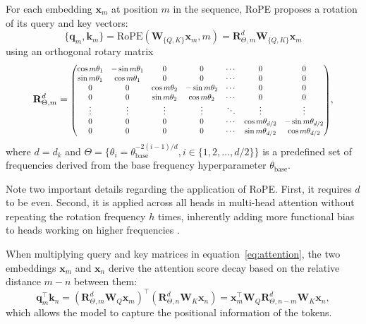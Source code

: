For each embedding \(\mathbf{x}_m\) at position \(m\) in the sequence, RoPE proposes a rotation of its query and key vectors:
\begin{equation}
	\{\mathbf{q}_m, \mathbf{k}_m\} = \mathrm{RoPE}(\mathbf{W}_{\{Q, K\}}\mathbf{x}_m, m) = \mathbf{R}^d_{\Theta, m}\mathbf{W}_{\{Q, K\}}\mathbf{x}_m 
\end{equation}
using an orthogonal rotary matrix  
\begin{equation}    
	\mathbf{R}^d_{\Theta,m} = 
	\scalebox{0.8}{\(
	\begin{pmatrix}
		\cos{m\theta_1}& -\sin{m\theta_1}&0&0&\cdots&0&0\\
		\sin{m\theta_1}&\cos{m\theta_1}&0&0&\cdots&0&0 \\
		0&0&\cos{m\theta_2}& -\sin{m\theta_2}&\cdots&0&0\\
		0&0&\sin{m\theta_2}&\cos{m\theta_2}&\cdots&0&0 \\
		\vdots&\vdots&\vdots&\vdots&\ddots&\vdots&\vdots\\
		0&0&0&0&\cdots&\cos{m\theta_{d/2}}& -\sin{m\theta_{d/2}}\\
		0&0&0&0&\cdots&\sin{m\theta_{d/2}}&\cos{m\theta_{d/2}}
	\end{pmatrix}
	\)},
\end{equation}
where \(d = d_k\) and \(\Theta = \{\theta_i=\theta_{\mathrm{base}}^{-2(i-1)/d}, i \in \{1, 2, \ldots, d/2\}\}\) is a predefined set of frequencies derived from the base frequency hyperparameter \(\theta_{\mathrm{base}}\).

Note two important details regarding the application of RoPE. First, it requires \(d\) to be even. Second, it is applied across all heads in multi-head attention without repeating the rotation frequency \(h\) times, inherently adding more functional bias to heads working on higher frequencies \parencite{barbero2024}.

When multiplying query and key matrices in equation~\ref{eq:attention}, the two embeddings \(\mathbf{x}_m\) and \(\mathbf{x}_n\) derive the attention score decay based on the relative distance \(m-n\) between them:
\begin{equation}
	\mathbf{q}_m^{\top}\mathbf{k}_n
	=(\mathbf{R}^d_{\Theta, m}\mathbf{W}_Q\mathbf{x}_m)^\top(\mathbf{R}^d_{\Theta, n}\mathbf{W}_K\mathbf{x}_n) =\mathbf{x}_m^\top\mathbf{W}_Q\mathbf{R}^d_{\Theta, n-m}\mathbf{W}_K\mathbf{x}_n,
\end{equation}
which allows the model to capture the positional information of the tokens.

